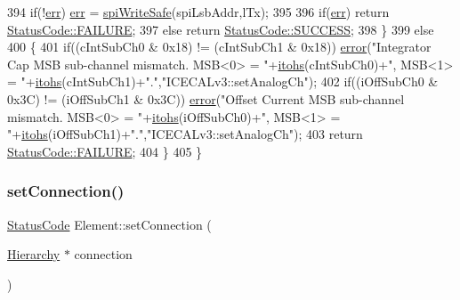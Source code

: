 \begin{DoxyCode}
394         \textcolor{keywordflow}{if}(!\hyperlink{classICECALv3_ad8989925ee5b3ff322d863ce6aaff0bd}{err}) \hyperlink{classICECALv3_ad8989925ee5b3ff322d863ce6aaff0bd}{err} = \hyperlink{classICECALv3_aa0b8358ea0be8e47a8aded5e1551787f}{spiWriteSafe}(spiLsbAddr,lTx);
395 
396         \textcolor{keywordflow}{if}(\hyperlink{classICECALv3_ad8989925ee5b3ff322d863ce6aaff0bd}{err}) \textcolor{keywordflow}{return} \hyperlink{classStatusCode_a6f565cbeadc76d14c72f047e5e85eb4ba3da73d4c469762eb9d3c960368252b26}{StatusCode::FAILURE};
397         \textcolor{keywordflow}{else}        \textcolor{keywordflow}{return} \hyperlink{classStatusCode_a6f565cbeadc76d14c72f047e5e85eb4badd0da38d3ba0d922efd1f4619bc37ad8}{StatusCode::SUCCESS};
398     \}
399     \textcolor{keywordflow}{else} 
400     \{
401         \textcolor{keywordflow}{if}((cIntSubCh0 & 0x18) != (cIntSubCh1 & 0x18)) \hyperlink{classObject_a204a95f57818c0f811933917a30eff45}{error}(\textcolor{stringliteral}{"Integrator Cap MSB sub-channel mismatch.
       MSB<0> = "}+\hyperlink{classICECALv3_a04b02e583f191bfce34d05132cd23834}{itohs}(cIntSubCh0)+\textcolor{stringliteral}{", MSB<1> = "}+\hyperlink{classICECALv3_a04b02e583f191bfce34d05132cd23834}{itohs}(cIntSubCh1)+\textcolor{stringliteral}{"."},\textcolor{stringliteral}{"ICECALv3::setAnalogCh"});
402         \textcolor{keywordflow}{if}((iOffSubCh0 & 0x3C) != (iOffSubCh1 & 0x3C)) \hyperlink{classObject_a204a95f57818c0f811933917a30eff45}{error}(\textcolor{stringliteral}{"Offset Current MSB sub-channel mismatch.
       MSB<0> = "}+\hyperlink{classICECALv3_a04b02e583f191bfce34d05132cd23834}{itohs}(iOffSubCh0)+\textcolor{stringliteral}{", MSB<1> = "}+\hyperlink{classICECALv3_a04b02e583f191bfce34d05132cd23834}{itohs}(iOffSubCh1)+\textcolor{stringliteral}{"."},\textcolor{stringliteral}{"ICECALv3::setAnalogCh"});
403         \textcolor{keywordflow}{return} \hyperlink{classStatusCode_a6f565cbeadc76d14c72f047e5e85eb4ba3da73d4c469762eb9d3c960368252b26}{StatusCode::FAILURE};
404     \}
405 \}
\end{DoxyCode}
\mbox{\label{classElement_ab476b4b1df5954141ceb14f072433b89}} 
\subsubsection{\texorpdfstring{set\+Connection()}{setConnection()}}
{\footnotesize\ttfamily \hyperlink{classStatusCode}{Status\+Code} Element\+::set\+Connection (\begin{DoxyParamCaption}\item[{\hyperlink{classHierarchy}{Hierarchy} $\ast$}]{connection }\end{DoxyParamCaption})\hspace{0.3cm}{\ttfamily [inherited]}}

